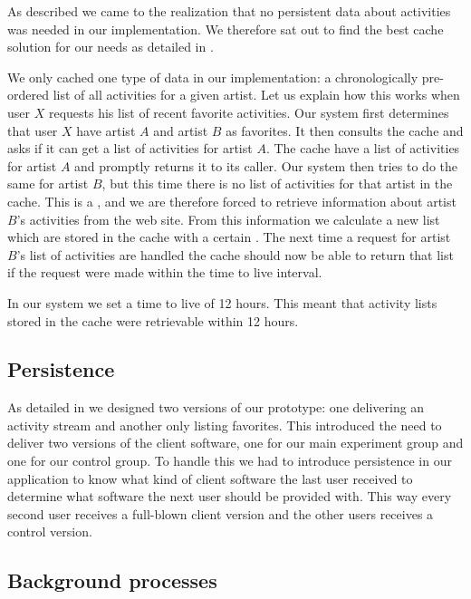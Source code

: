 As described we came to the realization that no persistent data
about activities was needed in our implementation.
We therefore sat out to find the best cache solution for our needs as detailed
in .

We only cached one type of data in our implementation:
a chronologically pre-ordered list of all activities for a given artist.
Let us explain how this works
when user $X$ requests his list of recent favorite activities. Our system
first determines that user $X$ have artist $A$ and artist $B$ as
favorites. It then consults the cache and asks if it can get a list of
activities for artist $A$. The cache have a list of activities for artist $A$
and promptly returns it to its caller. Our system then tries to do the same
for artist $B$, but this time there is no list of activities for that artist
in the cache. This is a , and we are therefore forced to
retrieve information about artist $B$'s activities from the \urort{} web site.
From this information we calculate a new list which are stored in the cache
with a certain
. The next time a request for artist $B$'s list of
activities are handled the cache should now be able to return that list
if the request were made within the time to live interval.

In our system we set a time to live of 12 hours. This meant that activity
lists stored in the cache were retrievable within 12 hours.

\subsection{Persistence}

As detailed in
we designed two versions of our prototype: one delivering an activity
stream and another only listing favorites. This introduced the need to deliver
two versions of the client software, one for our main experiment group and one
for our control group. To handle this we had to introduce persistence in our
application to know what kind of client software the last user received to
determine what software the next user should be provided with. This way every
second user receives a full-blown client version and the other users receives
a control version.

\subsection{Background processes}
\label{section:implementation.architecture.background.process}

